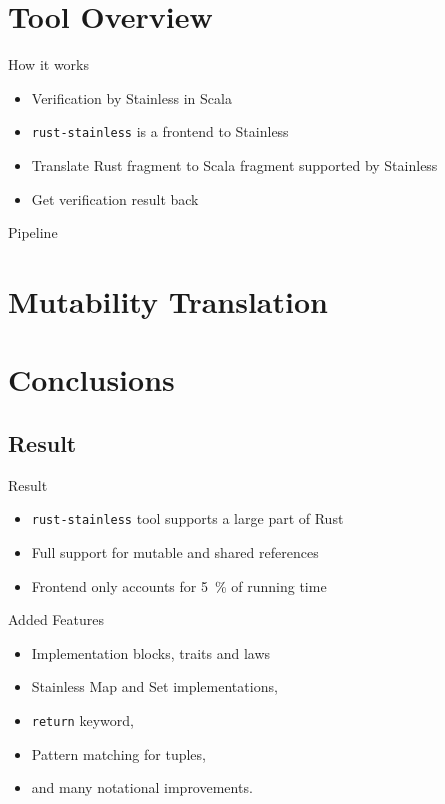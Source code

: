 \section{Tool Overview}

\begin{frame}{How it works}
\begin{itemize}
  \item Verification by Stainless in Scala
  \item \texttt{rust-stainless} is a frontend to Stainless
  \item Translate Rust fragment to Scala fragment supported by Stainless
  \item Get verification result back
\end{itemize}
\end{frame}

\begin{frame}{Pipeline}
\centering

\end{frame}




\section{Mutability Translation}













\section{Conclusions}

\subsection{Result}

\begin{frame}{Result}
\begin{itemize}
  \item \texttt{rust-stainless} tool supports a large part of Rust
  \item Full support for mutable and shared references
  \item Frontend only accounts for 5~\% of running time
\end{itemize}
\end{frame}

\begin{frame}{Added Features}
\begin{itemize}
\item Implementation blocks, traits and laws
\item Stainless Map and Set implementations,
\item \lstinline!return! keyword,
\item Pattern matching for tuples,
\item and many notational improvements.
\end{itemize}
\end{frame}

